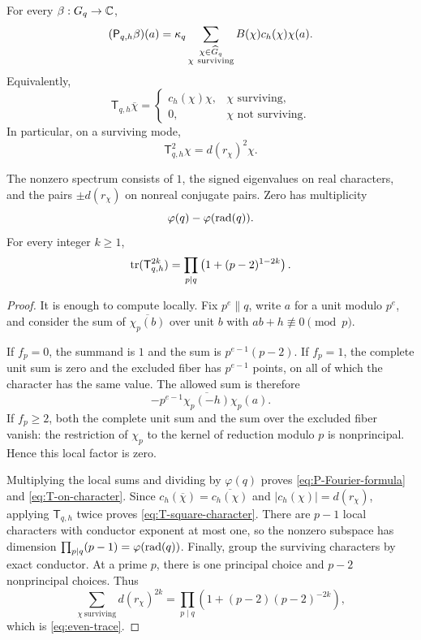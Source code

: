 \begin{theorem}
\label{thm:exact-local-spectrum}
For every $\beta:G_q\to\mathbb C$,
\begin{equation}\label{eq:P-Fourier-formula}
 (\mathsf P_{q,h}\beta)(a)
 =\kappa_q
  \sum_{\substack{\chi\in\widehat G_q\\\chi\ \mathrm{surviving}}}
  B(\chi)c_h(\chi)\chi(a).
\end{equation}
Equivalently,
\begin{equation}\label{eq:T-on-character}
 \mathsf T_{q,h}\overline\chi
 =\begin{cases}
   c_h(\chi)\chi,&\chi\text{ surviving},\\
   0,&\chi\text{ not surviving}.
  \end{cases}
\end{equation}
In particular, on a surviving mode,
\begin{equation}\label{eq:T-square-character}
 \mathsf T_{q,h}^{2}\chi=d(r_\chi)^2\chi.
\end{equation}

The nonzero spectrum consists of $1$, the signed eigenvalues on real
characters, and the pairs $\pm d(r_\chi)$ on nonreal conjugate pairs.  Zero
has multiplicity
\begin{equation}\label{eq:zero-multiplicity}
 \varphi(q)-\varphi(\operatorname{rad}(q)).
\end{equation}
For every integer $k\geq1$,
\begin{equation}\label{eq:even-trace}
 \operatorname{tr}(\mathsf T_{q,h}^{2k})
 =\prod_{p\mid q}\left(1+(p-2)^{1-2k}\right).
\end{equation}
\end{theorem}

\begin{proof}
It is enough to compute locally.  Fix $p^e\parallel q$, write $a$ for a
unit modulo $p^e$, and consider the sum of $\overline{\chi_p(b)}$ over
unit $b$ with $ab+h\not\equiv0\pmod p$.

If $f_p=0$, the summand is $1$ and the sum is
$p^{e-1}(p-2)$.  If $f_p=1$, the complete unit sum is zero and the excluded
fiber has $p^{e-1}$ points, on all of which the character has the same
value.  The allowed sum is therefore
\[
 -p^{e-1}\overline{\chi_p(-h)}\chi_p(a).
\]
If $f_p\geq2$, both the complete unit sum and the sum over the excluded
fiber vanish: the restriction of $\chi_p$ to the kernel of reduction modulo
$p$ is nonprincipal.  Hence this local factor is zero.

Multiplying the local sums and dividing by $\varphi(q)$ proves
\eqref{eq:P-Fourier-formula} and \eqref{eq:T-on-character}.  Since
$c_h(\overline\chi)=\overline{c_h(\chi)}$ and
$|c_h(\chi)|=d(r_\chi)$, applying $\mathsf T_{q,h}$ twice proves
\eqref{eq:T-square-character}.  There are $p-1$ local characters with
conductor exponent at most one, so the nonzero subspace has dimension
$\prod_{p\mid q}(p-1)=\varphi(\operatorname{rad}(q))$.  Finally, group the surviving
characters by exact conductor.  At a prime $p$, there is one principal
choice and $p-2$ nonprincipal choices.  Thus
\[
 \sum_{\chi\ \mathrm{surviving}}d(r_\chi)^{2k}
 =\prod_{p\mid q}\left(1+(p-2)(p-2)^{-2k}\right),
\]
which is \eqref{eq:even-trace}.
\end{proof}

